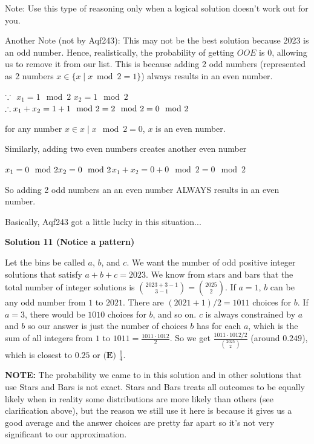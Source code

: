 \begin{enumerate}
 Note: Use this type of reasoning only when a logical solution doesn't work out for you.

 Another Note (not by Aqf243): This may not be the best solution because 2023 is an odd number. Hence, realistically, the probability of getting $OOE$ is 0, allowing us to remove it from our list. This is because adding 2 odd numbers (represented as 2 numbers $x \in \{ x \mid x \bmod 2 = 1 \}$) always results in an even number.

 
$\because \newline$ $x_1=1\mod{2}$
$x_2=1\mod{2}$
$\therefore \\ x_1+x_2=1+1 \mod{2}=2 \mod{2}= 0 \mod{2}$

 for any number $x\in{{}x\mid x\mod{2}=0{}}$, $x$ is an even number.

 Similarly, adding two even numbers creates another even number

 $x_1=0 \mod{2} \\ x_2=0 \mod{2}$$x_1+x_2=0+0 \mod{2}=0 \mod{2}$

 So adding 2 odd numbers an an even number ALWAYS results in an even number. 

 Basically, Aqf243 got a little lucky in this situation...

 



\textbf{Solution 11 (Notice a pattern)}

Let the bins be called $a$, $b$, and $c$. We want the number of odd positive integer solutions that satisfy $a + b + c = 2023$. We know from stars and bars that the total number of integer solutions is $\binom{2023 + 3 - 1}{3 - 1} = \binom{2025}{2}$. If $a = 1$, $b$ can be any odd number from $1$ to $2021$. There are $(2021 + 1)/2 = 1011$ choices for $b$. If $a = 3$, there would be $1010$ choices for $b$, and so on. $c$ is always constrained by $a$ and $b$ so our answer is just the number of choices $b$ has for each $a$, which is the sum of all integers from $1$ to $1011 = \frac{1011 \cdot 1012}{2}$. So we get $\frac{1011 \cdot 1012/2}{\binom{2025}{2}}$ (around $0.249$), which is closest to $0.25$ or $\boxed{\textbf{(E) }\frac{1}{4}}$.

 \textbf{NOTE:} The probability we came to in this solution and in other solutions that use Stars and Bars is not exact. Stars and Bars treats all outcomes to be equally likely when in reality some distributions are more likely than others (see clarification above), but the reason we still use it here is because it gives us a good average and the answer choices are pretty far apart so it’s not very significant to our approximation.


\end{enumerate}
